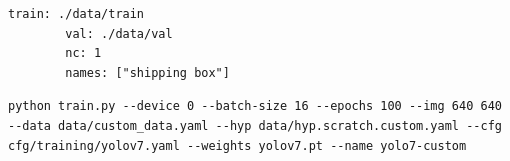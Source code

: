 \newpage
\begin{lstlisting}[style=bash-style,
    caption={custom\_data.yaml},
    breaklines=true,
    label={appendix:doku:lst:custom_data.yaml}]
        train: ./data/train
        val: ./data/val
        nc: 1
        names: ["shipping box"]
  \end{lstlisting}


\begin{lstlisting}[style=bash-style,
    caption={Befehl zum Trainieren des Modells},
    breaklines=true,
    label={appendix:doku:lst:runYolov7}]
    python train.py --device 0 --batch-size 16 --epochs 100 --img 640 640 --data data/custom_data.yaml --hyp data/hyp.scratch.custom.yaml --cfg cfg/training/yolov7.yaml --weights yolov7.pt --name yolo7-custom
  \end{lstlisting}
